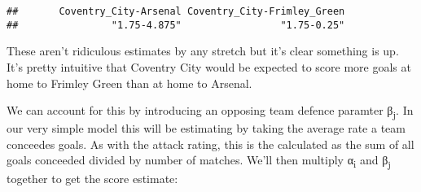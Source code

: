 \documentclass[]{article}
\newenvironment{Shaded}{\begin{snugshade}}{\end{snugshade}}
\newcommand{\KeywordTok}[1]{\textcolor[rgb]{0.13,0.29,0.53}{\textbf{#1}}}
\newcommand{\DataTypeTok}[1]{\textcolor[rgb]{0.13,0.29,0.53}{#1}}
\newcommand{\DecValTok}[1]{\textcolor[rgb]{0.00,0.00,0.81}{#1}}
\newcommand{\StringTok}[1]{\textcolor[rgb]{0.31,0.60,0.02}{#1}}
\newcommand{\CommentTok}[1]{\textcolor[rgb]{0.56,0.35,0.01}{\textit{#1}}}
\newcommand{\OperatorTok}[1]{\textcolor[rgb]{0.81,0.36,0.00}{\textbf{#1}}}
\newcommand{\NormalTok}[1]{#1}
\begin{document}
\begin{verbatim}
##       Coventry_City-Arsenal Coventry_City-Frimley_Green 
##                "1.75-4.875"                 "1.75-0.25"
\end{verbatim}

These aren't ridiculous estimates by any stretch but it's clear
something is up. It's pretty intuitive that Coventry City would be
expected to score more goals at home to Frimley Green than at home to
Arsenal.

We can account for this by introducing an opposing team defence paramter
β\textsubscript{j}. In our very simple model this will be estimating by
taking the average rate a team conceedes goals. As with the attack
rating, this is the calculated as the sum of all goals conceeded divided
by number of matches. We'll then multiply α\textsubscript{i} and
β\textsubscript{j} together to get the score estimate:

\begin{Shaded}
\end{Shaded}
\end{document}
